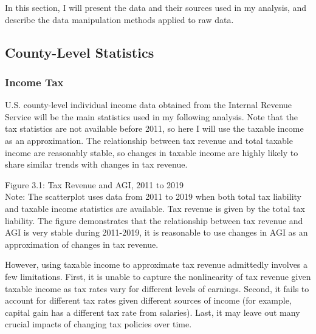 \documentclass{article}
\begin{document}
In this section, I will present the data and their sources used in my analysis, and describe the data manipulation methods applied to raw data. 

\subsection{County-Level Statistics}
\subsubsection{Income Tax}
U.S. county-level individual income data obtained from the Internal Revenue Service will be the main statistics used in my following analysis. Note that the tax statistics are not available before 2011, so here I will use the taxable income as an approximation. The relationship between tax revenue and total taxable income are reasonably stable, so changes in taxable income are highly likely to share similar trends with changes in tax revenue.

\begin{center}
Figure 3.1: Tax Revenue and AGI, 2011 to 2019\\
\noindent
{}
\noindent Note: The scatterplot uses data from 2011 to 2019 when both total tax liability and taxable income statistics are available. Tax revenue is given by the total tax liability. The figure demonstrates that the relationship between tax revenue and AGI is very stable during 2011-2019, it is reasonable to use changes in AGI as an approximation of changes in tax revenue.
\end{center}

However, using taxable income to approximate tax revenue admittedly involves a few limitations. First, it is unable to capture  the nonlinearity of tax revenue given taxable income as tax rates vary for different levels of earnings. Second, it fails to account for different tax rates given different sources of income (for example, capital gain has a different tax rate from salaries). Last, it may leave out many crucial impacts of changing tax policies over time. 
\end{document}
